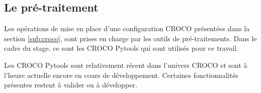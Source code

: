 \documentclass[10pt,a4paper,titlepage]{article}
\begin{document}
\subsection{Le pré-traitement}
\label{sub:outils_pretraitement}

Les opérations de mise en place d'une configuration CROCO présentées dans la section \ref{sub:croco}, sont prises en charge par les outils de pré-traitements. Dans le cadre du stage, ce sont les CROCO Pytools qui sont utilisés pour ce travail.




Les CROCO Pytools sont relativement récent dans l'univers CROCO et sont à l'heure actuelle encore en cours de développement. %
Certaines fonctionnalités présentes restent à valider ou à développer.


\end{document}
